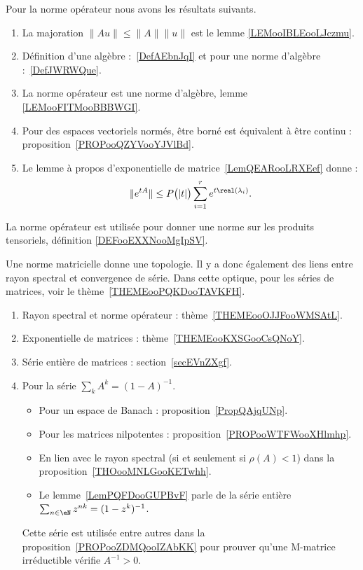     Pour la norme opérateur nous avons les résultats suivants.

    \begin{enumerate}
        \item
            La majoration \( \| Au \|\leq \| A \|\| u \|\) est le lemme \ref{LEMooIBLEooLJczmu}.
        \item
            Définition d'une algèbre :~\ref{DefAEbnJqI} et pour une norme d'algèbre :~\ref{DefJWRWQue}.
        \item
            La norme opérateur est une norme d'algèbre, lemme \ref{LEMooFITMooBBBWGI}.
        \item
            Pour des espaces vectoriels normés, être borné est équivalent à être continu : proposition~\ref{PROPooQZYVooYJVlBd}.
        \item
            Le lemme à propos d'exponentielle de matrice~\ref{LemQEARooLRXEef} donne :
            \begin{equation*}
                \|  e^{tA} \|\leq P\big( | t | \big)\sum_{i=1}^r e^{t\real(\lambda_i)}.
            \end{equation*}
    \end{enumerate}

    La norme opérateur est utilisée pour donner une norme sur les produits tensoriels, définition \ref{DEFooEXXNooMgIpSV}.

    Une norme matricielle donne une topologie. Il y a donc également des liens entre rayon spectral et convergence de série. Dans cette optique, pour les séries de matrices, voir le thème~\ref{THEMEooPQKDooTAVKFH}.


       \label{THEMEooPQKDooTAVKFH}

\begin{enumerate}
    \item
        Rayon spectral et norme opérateur : thème~\ref{THEMEooOJJFooWMSAtL}.
    \item
        Exponentielle de matrices : thème~\ref{THEMEooKXSGooCsQNoY}.
    \item
        Série entière de matrices : section~\ref{secEVnZXgf}.
    \item
        Pour la série \( \sum_kA^k=(1-A)^{-1}\).
        \begin{itemize}
            \item Pour un espace de Banach : proposition~\ref{PropQAjqUNp}.
            \item Pour les matrices nilpotentes : proposition~\ref{PROPooWTFWooXHlmhp}.
            \item En lien avec le rayon spectral (si et seulement si \( \rho(A)<1\)) dans la proposition~\ref{THOooMNLGooKETwhh}.
            \item Le lemme~\ref{LemPQFDooGUPBvF} parle de la série entière \( \sum_{n\in \eN}z^{nk}=(1-z^k)^{-1}\).
        \end{itemize}
        Cette série est utilisée entre autres dans la proposition~\ref{PROPooZDMQooIZAbKK} pour prouver qu'une M-matrice irréductible vérifie \( A^{-1}>0\).
\end{enumerate}


